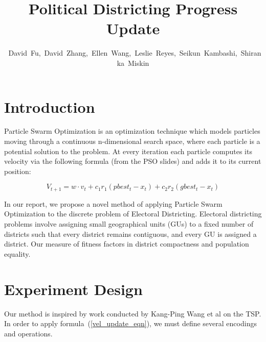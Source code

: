 \documentclass[journal]{IEEEtran}
\begin{document}
\title{Political Districting Progress Update}
\author{~David~Fu,~David~Zhang,~Ellen~Wang,~Leslie~Reyes,~Seikun~Kambashi,~Shiranka~Miskin}
\maketitle




\section{Introduction}

Particle Swarm Optimization is an optimization technique which models particles
moving through a continuous n-dimensional search space, where each particle is a
potential solution to the problem.  At every iteration each particle computes
its velocity via the following formula (from the PSO slides) and adds it to its
current position:

\begin{equation}
\label{vel_update_eqn}
V_{t+ 1} = w \cdot v_t + c_1 r_1 (pbest_t - x_t) + c_2 r_2 (gbest_t - x_t)
\end{equation}

In our report, we propose a novel method of applying Particle Swarm Optimization
to the discrete problem of Electoral Districting.  Electoral districting
problems involve assigning small geographical units (GUs) to a fixed number of
districts such that every district remains contiguous, and every GU is assigned
a district.  Our measure of fitness factors in district compactness and
population equality.

\section{Experiment Design}

Our method is inspired by work conducted by Kang-Ping Wang et al\cite{tsp-pso} on the
TSP\@. In order to apply formula~(\ref{vel_update_eqn}), we must define several
encodings and operations.
\end{document}

